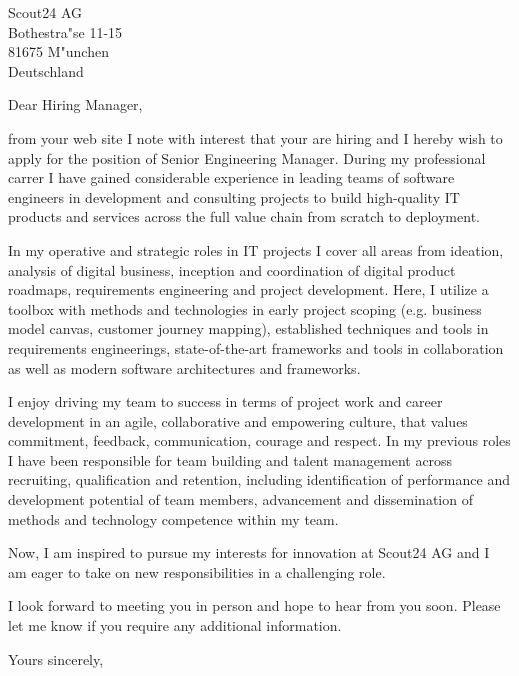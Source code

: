 \documentclass[10pt,a4paper]{dinbrief}
\date{\today}
\begin{document}
 
\begin{letter}  
{%
	Scout24 AG\\
	Bothestra"se 11-15\\
	81675 M"unchen\\
	Deutschland
}
\subject{\bf Job Application Senior Engineering Manager Berlin}
\opening{Dear Hiring Manager,}

from your web site I note with interest that your are  hiring and I hereby wish to apply for the position of Senior Engineering Manager. During my professional carrer I have gained considerable experience in leading teams of software engineers in development and consulting projects to build high-quality IT products and services across the full value chain from scratch to deployment. 

In my operative and strategic roles in IT projects I cover all areas from ideation, analysis of digital business, inception and coordination of digital product roadmaps, requirements engineering and project development. Here, I utilize a toolbox with methods and technologies in early project scoping (e.g. business model canvas, customer journey mapping), established techniques and tools in requirements engineerings, state-of-the-art frameworks and tools in collaboration as well as modern software architectures and frameworks.

I enjoy driving my team to success in terms of project work and career development in an agile, collaborative and empowering culture, that values commitment, feedback, communication, courage and respect. In my previous roles I have been responsible for team building and talent management across recruiting, qualification and retention, including identification of performance and development potential of team members, advancement and dissemination of methods and technology competence within my team.

Now, I am inspired to pursue my interests for innovation at Scout24 AG and I am eager to take on new responsibilities in a challenging role.

I look forward to meeting you in person and hope to hear from you soon. Please let me know if you require any additional information.

\closing{Yours sincerely,}
\end{letter}
\end{document}
